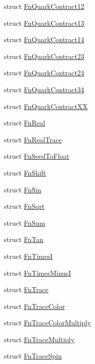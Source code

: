 \begin{DoxyCompactItemize}
struct \mbox{\hyperlink{structENSEM_1_1FnQuarkContract12}{Fn\+Quark\+Contract12}}
\item 
struct \mbox{\hyperlink{structENSEM_1_1FnQuarkContract13}{Fn\+Quark\+Contract13}}
\item 
struct \mbox{\hyperlink{structENSEM_1_1FnQuarkContract14}{Fn\+Quark\+Contract14}}
\item 
struct \mbox{\hyperlink{structENSEM_1_1FnQuarkContract23}{Fn\+Quark\+Contract23}}
\item 
struct \mbox{\hyperlink{structENSEM_1_1FnQuarkContract24}{Fn\+Quark\+Contract24}}
\item 
struct \mbox{\hyperlink{structENSEM_1_1FnQuarkContract34}{Fn\+Quark\+Contract34}}
\item 
struct \mbox{\hyperlink{structENSEM_1_1FnQuarkContractXX}{Fn\+Quark\+Contract\+XX}}
\item 
struct \mbox{\hyperlink{structENSEM_1_1FnReal}{Fn\+Real}}
\item 
struct \mbox{\hyperlink{structENSEM_1_1FnRealTrace}{Fn\+Real\+Trace}}
\item 
struct \mbox{\hyperlink{structENSEM_1_1FnSeedToFloat}{Fn\+Seed\+To\+Float}}
\item 
struct \mbox{\hyperlink{structENSEM_1_1FnShift}{Fn\+Shift}}
\item 
struct \mbox{\hyperlink{structENSEM_1_1FnSin}{Fn\+Sin}}
\item 
struct \mbox{\hyperlink{structENSEM_1_1FnSqrt}{Fn\+Sqrt}}
\item 
struct \mbox{\hyperlink{structENSEM_1_1FnSum}{Fn\+Sum}}
\item 
struct \mbox{\hyperlink{structENSEM_1_1FnTan}{Fn\+Tan}}
\item 
struct \mbox{\hyperlink{structENSEM_1_1FnTimesI}{Fn\+TimesI}}
\item 
struct \mbox{\hyperlink{structENSEM_1_1FnTimesMinusI}{Fn\+Times\+MinusI}}
\item 
struct \mbox{\hyperlink{structENSEM_1_1FnTrace}{Fn\+Trace}}
\item 
struct \mbox{\hyperlink{structENSEM_1_1FnTraceColor}{Fn\+Trace\+Color}}
\item 
struct \mbox{\hyperlink{structENSEM_1_1FnTraceColorMultiply}{Fn\+Trace\+Color\+Multiply}}
\item 
struct \mbox{\hyperlink{structENSEM_1_1FnTraceMultiply}{Fn\+Trace\+Multiply}}
\item 
struct \mbox{\hyperlink{structENSEM_1_1FnTraceSpin}{Fn\+Trace\+Spin}}
\item 

\end{DoxyCompactItemize}
